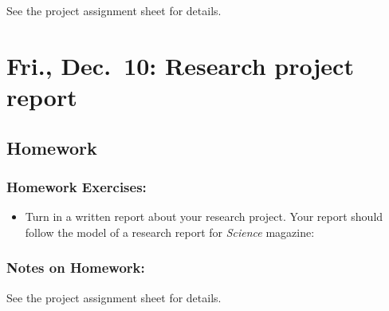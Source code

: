 \documentclass[
]{article}
\providecommand{\tightlist}{%
  \setlength{\itemsep}{0pt}\setlength{\parskip}{0pt}}
\begin{document}
See the project assignment sheet for details.

\hypertarget{fri.-dec.-10-research-project-report}{%
\section{Fri., Dec.~10: Research project
report}\label{fri.-dec.-10-research-project-report}}

\hypertarget{homework-16}{%
\subsection{Homework}\label{homework-16}}

\hypertarget{homework-exercises-16}{%
\subsubsection{Homework Exercises:}\label{homework-exercises-16}}

\begin{itemize}
\tightlist
\item
  Turn in a written report about your research project. Your report
  should follow the model of a research report for \emph{Science}
  magazine:
\end{itemize}

\hypertarget{notes-on-homework-12}{%
\subsubsection{Notes on Homework:}\label{notes-on-homework-12}}

See the project assignment sheet for details.
\end{document}
